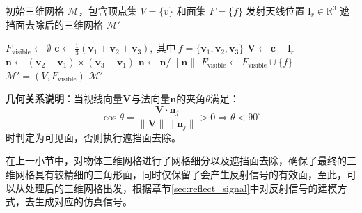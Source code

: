 \begin{algorithm}[H]
    \caption{遮挡面去除算法}
    \label{alg:occlusion_culling}
    \begin{algorithmic}[1]
    \Require 
    \Statex 初始三维网格 $\mathcal{M}$，包含顶点集 $V = \{v\}$ 和面集 $F = \{f\}$
    \Statex 发射天线位置 $\mathbf{l}_r \in \mathbb{R}^3$
    \Ensure 遮挡面去除后的三维网格 $\mathcal{M}'$
    
    \State $F_{\text{visible}} \gets \emptyset$ \label{line:init}
     
    \State  $\mathbf{c} \gets \frac{1}{3}(\mathbf{v}_1 + \mathbf{v}_2 + \mathbf{v}_3),\ \text{其中}\ f = \{\mathbf{v}_1, \mathbf{v}_2, \mathbf{v}_3\}$ 
    \State  $\mathbf{V} \gets \mathbf{c} - \mathbf{l}_r$ 
    \State  $\mathbf{n} \gets (\mathbf{v}_2 - \mathbf{v}_1) \times (\mathbf{v}_3 - \mathbf{v}_1)$ 
    \State  $\mathbf{n} \gets \mathbf{n} / \|\mathbf{n}\|$
     \label{line:dot_product} 
    \State $F_{\text{visible}} \gets F_{\text{visible}} \cup \{f\}$ \label{line:add_face}
    \EndIf
    \EndFor
    \State $\mathcal{M}' = (V, F_{\text{visible}})$
    \State \Return $\mathcal{M}'$ \label{line:return}
    \EndFunction
    \end{algorithmic}
    
    \medskip
    \noindent
    \textbf{几何关系说明}：当视线向量$\mathbf{V}$与法向量$\mathbf{n}$的夹角$\theta$满足：
    \begin{equation*}
    \cos\theta = \frac{\mathbf{V} \cdot \mathbf{n}_j}{\|\mathbf{V}\|\|\mathbf{n}_j\|} > 0 \Rightarrow \theta < 90^\circ
    \end{equation*}
    时判定为可见面，否则执行遮挡面去除。
\end{algorithm}
在上一小节中，对物体三维网格进行了网格细分以及遮挡面去除，确保了最终的三维网格具有较精细的三角形面，同时仅保留了会产生反射信号的有效面，至此，可以从处理后的三维网格出发，根据章节\ref{sec:reflect_signal}中对反射信号的建模方式，去生成对应的仿真信号。

